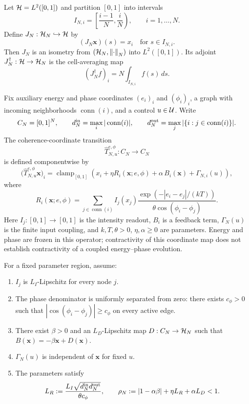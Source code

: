 \begin{definition}
Let $\mathcal{H}=L^2([0,1])$ and partition $[0,1]$ into intervals
\[
I_{N,i}=\left[\frac{i-1}{N},\frac{i}{N}\right),\qquad i=1,\dots,N.
\]
Define $J_N:\mathcal{H}_N\hookrightarrow \mathcal{H}$ by
\[
(J_N\mathbf{x})(s)=x_i\quad\text{for }s\in I_{N,i}.
\]
Then $J_N$ is an isometry from $(\mathcal{H}_N,\left\lVert \cdot \right\rVert_N)$ into $L^2([0,1])$. Its adjoint $J_N^\dagger:\mathcal{H}\to\mathcal{H}_N$ is the cell-averaging map
\[
(J_N^\dagger f)_i=N\int_{I_{N,i}}f(s)\,ds.
\]
\end{definition}

\begin{definition}
Fix auxiliary energy and phase coordinates $(e_i)_i$ and $(\phi_i)_i$, a graph with incoming neighborhoods $\operatorname{conn}(i)$, and a control $u\in\mathcal{U}$. Write
\[
C_N=[0,1]^N,\qquad
d_N^{\rm in}=\max_i|\operatorname{conn}(i)|,\qquad
d_N^{\rm out}=\max_j|\{i:j\in\operatorname{conn}(i)\}|.
\]
The coherence-coordinate transition
\[
\widehat T_{N,u}^{e,\phi}:C_N\to C_N
\]
is defined componentwise by
\[
\bigl(\widehat T_{N,u}^{e,\phi}\mathbf{x}\bigr)_i
=
\operatorname{clamp}_{[0,1]}\!\left(
x_i+\eta R_i(\mathbf{x};e,\phi)+\alpha\,B_i(\mathbf{x})+\Gamma_{N,i}(u)
\right),
\]
where
\[
R_i(\mathbf{x};e,\phi)
=
\sum_{j\in\operatorname{conn}(i)}
I_j(x_j)
\frac{\exp(-|e_i-e_j|/(kT))}
{\theta\cos(\phi_i-\phi_j)}.
\]
Here $I_j:[0,1]\to[0,1]$ is the intensity readout, $B_i$ is a feedback term, $\Gamma_N(u)$ is the finite input coupling, and $k,T,\theta>0$, $\eta,\alpha\geq0$ are parameters. Energy and phase are frozen in this operator; contractivity of this coordinate map does not establish contractivity of a coupled energy--phase evolution.
\end{definition}

\begin{assumption}\label{ass:discrete-regularity}
For a fixed parameter region, assume:
\begin{enumerate}[leftmargin=*]
\item $I_j$ is $L_I$-Lipschitz for every node $j$.
\item The phase denominator is uniformly separated from zero: there exists $c_\phi>0$ such that $|\cos(\phi_i-\phi_j)|\ge c_\phi$ on every active edge.
\item There exist $\beta>0$ and an $L_D$-Lipschitz map $D:C_N\to\mathcal{H}_N$ such that $B(\mathbf{x})=-\beta\mathbf{x}+D(\mathbf{x})$.
\item $\Gamma_N(u)$ is independent of $\mathbf{x}$ for fixed $u$.
\item The parameters satisfy
\[
L_R:=\frac{L_I\sqrt{d_N^{\rm in}d_N^{\rm out}}}{\theta c_\phi},
\qquad
\rho_N:=|1-\alpha\beta|+\eta L_R+\alpha L_D<1.
\]
\end{enumerate}
\end{assumption}

